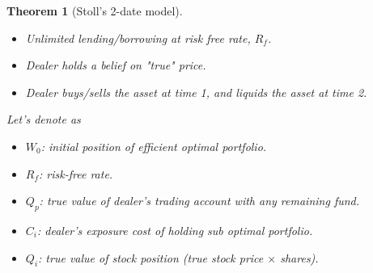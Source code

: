 \documentclass[a4]{article}
\newtheorem{theorem}{Theorem}
\begin{document}
\noindent\begin{theorem}[Stoll's 2-date model]\par 
\bigbreak 
	\begin{itemize}	\textbf{Assumption}
		\item Unlimited lending/borrowing at risk free rate, $R_{f}$.
		\item Dealer holds a belief on "true" price.
		\item Dealer buys/sells the asset at time 1, and liquids the asset at time 2.
	\end{itemize}\par 
\bigbreak
Let's denote as \begin{itemize}
	\item $W_{0}$: initial position of efficient optimal portfolio.
	\item $R_{f}$: risk-free rate.
	\item $Q_{p}$: true value of dealer's trading account with any remaining fund.
	\item $C_{i}$: dealer's exposure cost of holding sub optimal portfolio.
	\item $Q_{i}$: true value of stock position (true stock price $\times$ shares).
	

\end{itemize}
\end{theorem}
\end{document}
